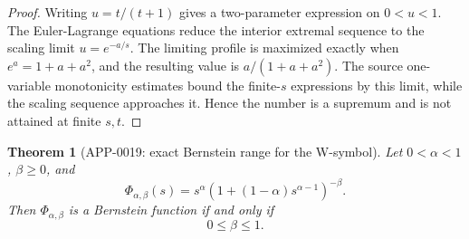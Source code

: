 \documentclass[11pt]{article}
\numberwithin{equation}{section}
\newtheorem{theorem}{Theorem}[section]
\theoremstyle{definition}
\theoremstyle{remark}
\newcommand{\1}{\mathbf 1}
\begin{document}
\begin{proof}
Writing \(u=t/(t+1)\) gives a two-parameter expression on \(0<u<1\).  The
Euler-Lagrange equations reduce the interior extremal sequence to the scaling
limit \(u=e^{-a/s}\).  The limiting profile is maximized exactly when
\(e^a=1+a+a^2\), and the resulting value is \(a/(1+a+a^2)\).  The source
one-variable monotonicity estimates bound the finite-\(s\) expressions by this
limit, while the scaling sequence approaches it.  Hence the number is a
supremum and is not attained at finite \(s,t\).
\end{proof}

\begin{theorem}[APP-0019: exact Bernstein range for the W-symbol]
\label{thm:app19-w-symbol}
Let \(0<\alpha<1\), \(\beta\ge0\), and
\[
  \Phi_{\alpha,\beta}(s)
     =s^\alpha\left(1+(1-\alpha)s^{\alpha-1}\right)^{-\beta}.
\]
Then \(\Phi_{\alpha,\beta}\) is a Bernstein function if and only if
\[
  0\le \beta\le 1 .
\]
\end{theorem}
\end{document}

